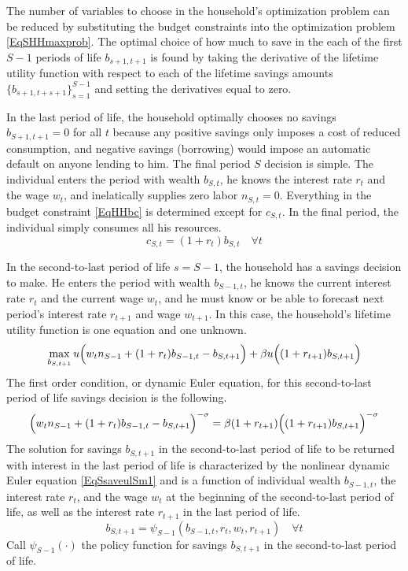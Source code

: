 \documentclass[letterpaper,12pt]{article}
\theoremstyle{definition}
\numberwithin{equation}{section}
\numberwithin{exercise}{section}
\begin{document}
\begin{spacing}{1.5}
      The number of variables to choose in the household's optimization problem can be reduced by substituting the budget constraints into the optimization problem \eqref{EqSHHmaxprob}. The optimal choice of how much to save in the each of the first $S-1$ periods of life $b_{s+1,t+1}$ is found by taking the derivative of the lifetime utility function with respect to each of the lifetime savings amounts $\{b_{s+1,t+s+1}\}_{s=1}^{S-1}$ and setting the derivatives equal to zero.

      In the last period of life, the household optimally chooses no savings $b_{S+1,t+1}=0$ for all $t$ because any positive savings only imposes a cost of reduced consumption, and negative savings (borrowing) would impose an automatic default on anyone lending to him. The final period $S$ decision is simple. The individual enters the period with wealth $b_{S,t}$, he knows the interest rate $r_t$ and the wage $w_t$, and inelatically supplies zero labor $n_{S,t}=0$. Everything in the budget constraint \eqref{EqHHbc} is determined except for $c_{S,t}$. In the final period, the individual simply consumes all his resources.
      \begin{equation}\label{EqScSt}
         c_{S,t} = (1 + r_{t})b_{S,t} \quad\forall t
      \end{equation}

      In the second-to-last period of life $s=S-1$, the household has a savings decision to make. He enters the period with wealth $b_{S-1,t}$, he knows the current interest rate $r_t$ and the current wage $w_t$, and he must know or be able to forecast next period's interest rate $r_{t+1}$ and wage $w_{t+1}$. In this case, the household's lifetime utility function is one equation and one unknown.
      \begin{equation}\label{EqSlifutSm1}
         \max_{b_{S,t+1}} u\Bigl(w_t n_{S-1} + (1 + r_{t})b_{S-1,t} - b_{S,t+1}\Bigr) + \beta u\Bigl((1 + r_{t+1})b_{S,t+1}\Bigr)
      \end{equation}
      The first order condition, or dynamic Euler equation, for this second-to-last period of life savings decision is the following.
      \begin{equation}\label{EqSsaveulSm1}
         \Bigl(w_t n_{S-1} + (1 + r_{t})b_{S-1,t} - b_{S,t+1}\Bigr)^{-\sigma} = \beta(1+r_{t+1})\Bigl((1 + r_{t+1})b_{S,t+1}\Bigr)^{-\sigma}
      \end{equation}
      The solution for savings $b_{S,t+1}$ in the second-to-last period of life to be returned with interest in the last period of life is characterized by the nonlinear dynamic Euler equation \eqref{EqSsaveulSm1} and is a function of individual wealth $b_{S-1,t}$, the interest rate $r_t$, and the wage $w_t$ at the beginning of the second-to-last period of life, as well as the interest rate $r_{t+1}$ in the last period of life.
      \begin{equation}\label{EqSpsiSm1}
         b_{S,t+1} = \psi_{S-1}\left(b_{S-1,t}, r_t, w_t, r_{t+1}\right) \quad\forall t
      \end{equation}
      Call $\psi_{S-1}(\cdot)$ the policy function for savings $b_{S,t+1}$ in the second-to-last period of life.


\end{spacing}
\end{document}
